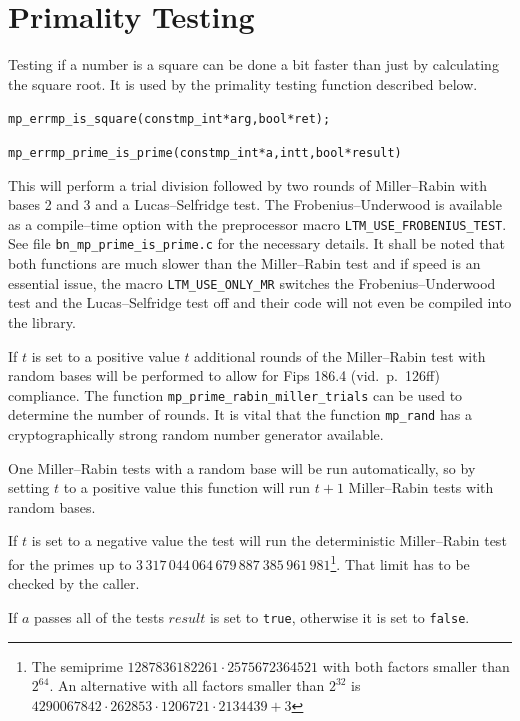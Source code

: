 \documentclass[synpaper]{book}
\begin{document}
\section{Primality Testing}
Testing if a number is a square can be done a bit faster than just by calculating the square root.
It is used by the primality testing function described below.
\begin{alltt}
mp_err mp_is_square(const mp_int *arg, bool *ret);
\end{alltt}

\begin{alltt}
mp_err mp_prime_is_prime(const mp_int *a, int t, bool *result)
\end{alltt}
This will perform a trial division followed by two rounds of Miller--Rabin with bases 2 and 3 and a
Lucas--Selfridge test. The Frobenius--Underwood is available as a compile--time option with the
preprocessor macro \texttt{LTM\_USE\_FROBENIUS\_TEST}. See file \texttt{bn\_mp\_prime\_is\_prime.c}
for the necessary details. It shall be noted that both functions are much slower than the
Miller--Rabin test and if speed is an essential issue, the macro \texttt{LTM\_USE\_ONLY\_MR}
switches the Frobenius--Underwood test and the Lucas--Selfridge test off and their code will not
even be compiled into the library.

If $t$ is set to a positive value $t$ additional rounds of the Miller--Rabin test with random bases
will be performed to allow for Fips 186.4 (vid.~p.~126ff) compliance. The function
\texttt{mp\_prime\_rabin\_miller\_trials} can be used to determine the number of rounds. It is
vital that the function \texttt{mp\_rand} has a cryptographically strong random number generator
available.

One Miller--Rabin tests with a random base will be run automatically, so by setting $t$ to a
positive value this function will run $t + 1$ Miller--Rabin tests with random bases.

If  $t$ is set to a negative value the test will run the deterministic Miller--Rabin test for the
primes up to $3\,317\,044\,064\,679\,887\ 385\,961\,981$\footnote{The semiprime $1287836182261\cdot
    2575672364521$ with both factors smaller than $2^{64}$. An alternative with all factors smaller
  than
  $2^32$ is $4290067842\cdot 262853\cdot 1206721\cdot 2134439 + 3$}. That limit has to be checked
by
the caller.

If $a$ passes all of the tests $result$ is set to \texttt{true}, otherwise it is set to
\texttt{false}.
\end{document}
